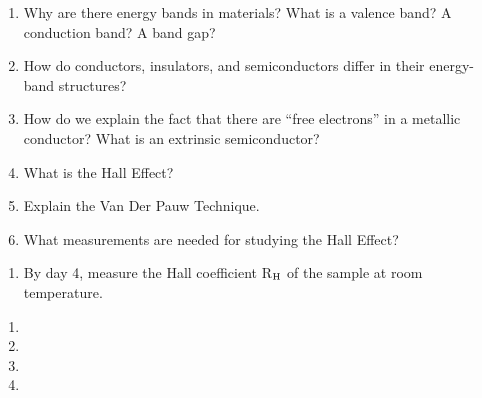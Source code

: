 \documentclass{../signatures}
\begin{document}
\maketitle

\names

\prelab

\begin{enumerate}

    \item Why are there energy bands in materials? What is a valence band? A conduction band? A band gap?
    
    \item How do conductors, insulators, and semiconductors differ in their energy-band structures?

    \item How do we explain the fact that there are “free electrons” in a metallic conductor? What is an extrinsic semiconductor?

    \item What is the Hall Effect?
    
    \item Explain the Van Der Pauw Technique.
    
    \item What measurements are needed for studying the Hall Effect?
    \\[36pt]
\end{enumerate}

\prelabsignatures

\midlab

\begin{enumerate}

    \item By day 4, measure the Hall coefficient R$_{\rm H}$ of the sample at room temperature.
\\[36pt]
\end{enumerate}

\newpage
\checkpointsection 
\begin{enumerate}

\item {}

\item {}

\item {}

\item {}

\end{enumerate}
\end{document}
